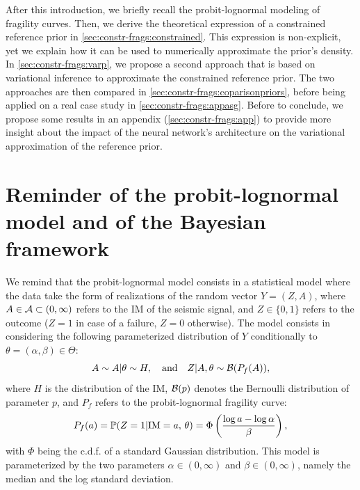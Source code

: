 After this introduction, we briefly recall the probit-lognormal modeling of %
fragility curves. Then, we derive the theoretical expression of a constrained reference prior in \cref{sec:constr-frags:constrained}.
This expression is non-explicit, yet we explain how it can be used to numerically approximate the prior's density.
In \cref{sec:constr-frags:varp}, we propose a second approach that is based on variational inference to approximate the constrained reference prior.
The two approaches are then compared in \cref{sec:constr-frags:coparisonpriors}, before being applied on a real case study in \cref{sec:constr-frags:appasg}.
Before to conclude, we propose some results in an appendix (\cref{sec:constr-frags:app}) to provide more insight about the impact of the neural network's architecture on the variational approximation of the reference prior.








\section{Reminder of the probit-lognormal model and of the Bayesian framework}\label{sec:constr-frags:model}


We remind that the probit-lognormal model consists in a statistical model where the data take the form of realizations of the random vector $Y=(Z,A)$, where $A\in\mathcal{A}\subset(0,\infty)$ refers to the IM of the seismic signal, and $Z\in\{0,1\}$ refers to the outcome ($Z=1$ in case of a failure, $Z=0$ otherwise). The model consists in considering
the following parameterized distribution of $Y$ conditionally to $\theta=(\alpha,\beta)\in\Theta$:
    \begin{equation}
        A\sim A|\theta\sim H,\quad\text{and}\quad Z|A,\theta\sim\mathcal{B}(P_f(A)),
    \end{equation}
where $H$ is the distribution of the IM, $\mathcal{B}(p)$ denotes the Bernoulli distribution of parameter $p$, and $P_f$ refers to the probit-lognormal fragility curve:
\begin{equation}
    P_f(a) = \mathbb{P}(Z=1|\text{IM}=a,\,\theta) = \Phi\left(\frac{\log a-\log\alpha}{\beta}\right),
\end{equation}
with $\Phi$ being the c.d.f. of a standard Gaussian distribution. This model is parameterized by the two parameters $\alpha\in(0,\infty)$ and $\beta\in(0,\infty)$, namely the median and the log standard deviation. 

